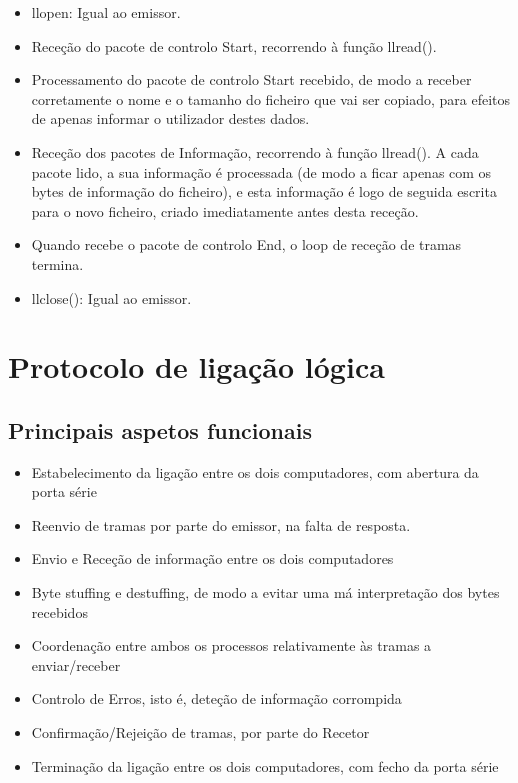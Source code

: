 \documentclass[article, a4paper, 11pt, oneside]{memoir}
\begin{document}
\begin{itemize}
 	\item llopen: Igual ao emissor.
 	\item Receção do pacote de controlo Start, recorrendo à função llread().
 	\item Processamento do pacote de controlo Start recebido, de modo a receber corretamente o nome e o tamanho do ficheiro que vai ser copiado, para efeitos de apenas informar o utilizador destes dados.
 	\item Receção dos pacotes de Informação, recorrendo à função llread(). A cada pacote lido, a sua informação é processada (de modo a ficar apenas com os bytes de informação do ficheiro), e esta informação é logo de seguida escrita para o novo ficheiro, criado imediatamente antes desta receção.
 	\item Quando recebe o pacote de controlo End, o loop de receção de tramas termina.
 	\item llclose(): Igual ao emissor.
\end{itemize}

\chapter[Protocolo de ligação lógica][Protocolo de ligação lógica]{Protocolo de ligação lógica} \label{\thechapter}

\section{Principais aspetos funcionais}
\begin{itemize}
 \item Estabelecimento da ligação entre os dois computadores, com abertura da porta série
 \item Reenvio de tramas por parte do emissor, na falta de resposta.
 \item Envio e Receção de informação entre os dois computadores
 \item Byte stuffing e destuffing, de modo a evitar uma má interpretação dos bytes recebidos
 \item Coordenação entre ambos os processos relativamente às tramas a enviar/receber
 \item Controlo de Erros, isto é, deteção de informação corrompida
 \item Confirmação/Rejeição de tramas, por parte do Recetor
 \item Terminação da ligação entre os dois computadores, com fecho da porta série
\end{itemize}
\end{document}
